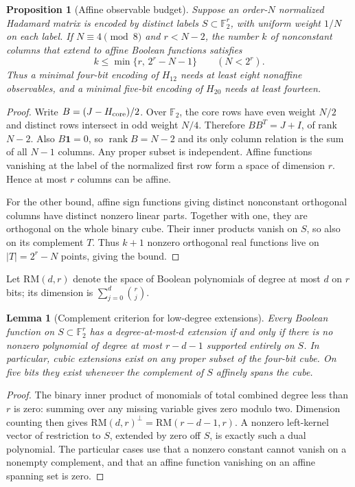 \documentclass[11pt]{article}
\newtheorem{lemma}[theorem]{Lemma}
\newtheorem{proposition}[theorem]{Proposition}
\begin{document}
\begin{proposition}[Affine observable budget]
\label{prop:nonlinear-affine-budget}
Suppose an order-$N$ normalized Hadamard matrix is encoded by distinct
labels $S\subset\mathbb F_2^r$, with uniform weight $1/N$ on each label.
If $N\equiv4\pmod8$ and $r<N-2$, the number $k$ of nonconstant columns
that extend to affine Boolean functions satisfies
\[
 k\le\min\{r,\,2^r-N-1\}\qquad(N<2^r).
\]
Thus a minimal four-bit encoding of $H_{12}$ needs at least eight
nonaffine observables, and a minimal five-bit encoding of $H_{20}$
needs at least fourteen.
\end{proposition}
\begin{proof}
Write $B=(J-H_{\rm core})/2$. Over $\mathbb F_2$, the core rows have
even weight $N/2$ and distinct rows intersect in odd weight $N/4$.
Therefore $BB^T=J+I$, of rank $N-2$. Also $B\mathbf1=0$, so
$\operatorname{rank}B=N-2$ and its only column relation is the sum
of all $N-1$ columns. Any proper subset is independent. Affine functions
vanishing at the label of the normalized first row form a space of
dimension $r$. Hence at most $r$ columns can be affine.

For the other bound, affine sign functions giving distinct nonconstant
orthogonal columns have distinct nonzero linear parts. Together with
one, they are orthogonal on the whole binary cube. Their inner products
vanish on $S$, so also on its complement $T$. Thus $k+1$ nonzero
orthogonal real functions live on $|T|=2^r-N$ points, giving the bound.
\end{proof}

Let $\mathrm{RM}(d,r)$ denote the space of Boolean polynomials of degree
at most $d$ on $r$ bits; its dimension is $\sum_{j=0}^d\binom rj$.
\begin{lemma}[Complement criterion for low-degree extensions]
\label{lem:nonlinear-extension}
Every Boolean function on $S\subset\mathbb F_2^r$ has a degree-at-most-$d$
extension if and only if there is no nonzero polynomial of degree at
most $r-d-1$ supported entirely on $S$. In particular, cubic extensions
exist on any proper subset of the four-bit cube. On five bits they
exist whenever the complement of $S$ affinely spans the cube.
\end{lemma}
\begin{proof}
The binary inner product of monomials of total combined degree less
than $r$ is zero: summing over any missing variable gives zero modulo
two. Dimension counting then gives
$\mathrm{RM}(d,r)^\perp=\mathrm{RM}(r-d-1,r)$.
A nonzero left-kernel vector of restriction to $S$, extended by zero
off $S$, is exactly such a dual polynomial. The particular cases use
that a nonzero constant cannot vanish on a nonempty complement, and
that an affine function vanishing on an affine spanning set is zero.
\end{proof}
\end{document}
